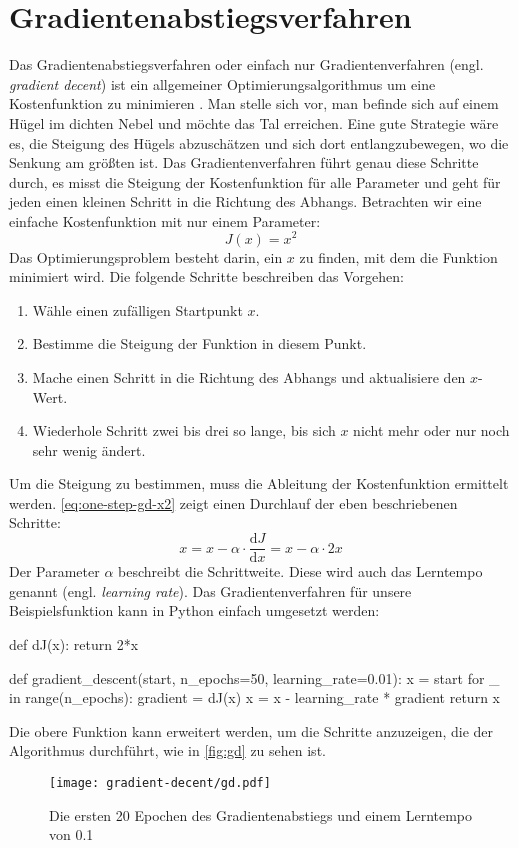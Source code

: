 \chapter{Gradientenabstiegsverfahren}
\label{appx:gradient-descent}
Das Gradientenabstiegsverfahren oder einfach nur Gradientenverfahren
(engl. \textit{gradient decent})
ist ein allgemeiner Optimierungsalgorithmus
um eine Kostenfunktion zu minimieren \parencite[118]{book:hands-on-ml}.
Man stelle sich vor, man befinde sich auf einem Hügel im dichten Nebel
und möchte das Tal erreichen.
Eine gute Strategie wäre es, die Steigung des
Hügels abzuschätzen und sich dort entlangzubewegen,
wo die Senkung am größten ist.
Das Gradientenverfahren führt genau diese Schritte durch,
es misst die Steigung der Kostenfunktion für alle Parameter
und geht für jeden einen kleinen Schritt in die Richtung des Abhangs.
Betrachten wir eine einfache Kostenfunktion
mit nur einem Parameter:
\begin{equation*}
  J(x) = x^2 
\end{equation*}
Das Optimierungsproblem besteht darin, ein $x$ zu finden, mit dem die Funktion minimiert wird.
Die folgende Schritte beschreiben das Vorgehen:
\begin{enumerate}
  \item Wähle einen zufälligen Startpunkt $x$.
  \item Bestimme die Steigung der Funktion in diesem Punkt.
  \item Mache einen Schritt in die Richtung des Abhangs und aktualisiere den $x$-Wert.
  \item Wiederhole Schritt zwei bis drei so lange,
        bis sich $x$ nicht mehr oder nur noch sehr wenig ändert.
\end{enumerate}
Um die Steigung zu bestimmen, muss die Ableitung der Kostenfunktion ermittelt werden.
\autoref{eq:one-step-gd-x2} zeigt einen Durchlauf der eben beschriebenen Schritte:
\begin{equation}
  x = x - \alpha \cdot \frac{\mathrm{d}J}{\mathrm{d}x} = x - \alpha \cdot 2x
  \label{eq:one-step-gd-x2}
\end{equation}
Der Parameter $\alpha$ beschreibt die Schrittweite. Diese wird auch das
Lerntempo genannt (engl. \textit{learning rate}).
Das Gradientenverfahren für unsere Beispielsfunktion kann in Python 
einfach umgesetzt werden:
\begin{pythoncode}
def dJ(x):
    return 2*x

def gradient_descent(start, n_epochs=50, learning_rate=0.01):
    x = start
    for _ in range(n_epochs):
        gradient = dJ(x)
        x = x - learning_rate * gradient
    return x
\end{pythoncode}
Die obere Funktion kann erweitert werden, um die Schritte anzuzeigen,
die der Algorithmus durchführt, wie in \autoref{fig:gd} zu sehen ist.
\begin{figure}[h!]
  \centering
  \texttt{[image: gradient-decent/gd.pdf]}
  \caption{Die ersten 20 Epochen des Gradientenabstiegs und einem Lerntempo von \num{0.1}}
  \label{fig:gd}
\end{figure}


